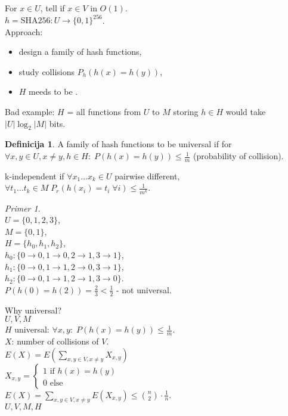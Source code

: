 \documentclass[a4paper, 12pt]{book}
\theoremstyle{definition}
\newtheorem{defn}[counter]{Definicija}
\theoremstyle{remark}
\newtheorem*{ex}{Primer}
\begin{document}
For $x \in U$, tell if $x \in V$ in $O(1)$. \\
$h = \text{SHA256}: U \to \{0, 1\}^{256}$. \\
Approach:
\begin{itemize}
  \item design a family of hash functions,
  \item study collisions $P_h(h(x) = h(y))$,
  \item $H$ meeds to be .
\end{itemize}
Bad example: $H$ = all functions from $U$ to $M$ storing $h \in H$ would take $|U| \log_2 |M|$ bits.
\begin{defn}
  A family of hash functions to be universal if for \\
  $\forall x, y \in U, x \neq y, h \in H: \; P(h(x) = h(y)) \leq \frac{1}{m}$ (probability of collision).
\end{defn}
k-independent if $\forall x_1 \dots x_k \in U$ pairwise different, $\forall t_1 \dots t_k \in M \;
P_r(h(x_i) = t_i \; \forall i) \leq \frac{1}{m^k}$.
\begin{ex} \text{} \\
  $U = \{0, 1, 2, 3\}$, \\
  $M = \{0, 1\}$, \\
  $H = \{h_0, h_1, h_2\}$, \\
  $h_0: \{0 \to 0, 1 \to 0, 2 \to 1, 3 \to 1\}$, \\
  $h_1: \{0 \to 0, 1 \to 1, 2 \to 0, 3 \to 1\}$, \\
  $h_2: \{0 \to 0, 1 \to 1, 2 \to 1, 3 \to 0\}$. \\
  $P(h(0) = h(2)) = \frac{2}{3} < \frac{1}{2}$ - not universal.
\end{ex}
Why universal? \\
$U, V, M$ \\
$H$ universal: $\forall x, y: \; P(h(x) = h(y)) \leq \frac{1}{m}$. \\
$X$: number of collisions of $V$. \\
$E(X) = E\left(\sum_{x,y \in V, x \neq y} X_{x,y}\right)$ \\
$X_{x,y} = \begin{cases}
  1 \text{ if } h(x) = h(y) \\
  0 \text{ else}
\end{cases}$ \\
$E(X) = \sum_{x,y \in V, x \neq y} E(X_{x,y}) \leq \binom{n}{2} \cdot \frac{1}{n}$. \\
$U, V, M, H$ \\
\end{document}
